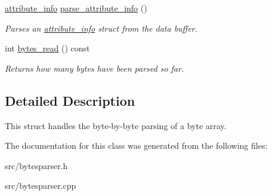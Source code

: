 \begin{DoxyCompactItemize}
\mbox{\label{classBytesParser_ab7c84f75bd3dc2bcac74fd3ff4c6510a}} 
\hyperlink{structattribute__info}{attribute\+\_\+info} \hyperlink{classBytesParser_ab7c84f75bd3dc2bcac74fd3ff4c6510a}{parse\+\_\+attribute\+\_\+info} ()
\begin{DoxyCompactList}\small\item\em Parses an \hyperlink{structattribute__info}{attribute\+\_\+info} struct from the data buffer. \end{DoxyCompactList}\item 
\mbox{\label{classBytesParser_a37f2e2e19b23ba08982241c7ed53b43a}} 
int \hyperlink{classBytesParser_a37f2e2e19b23ba08982241c7ed53b43a}{bytes\+\_\+read} () const
\begin{DoxyCompactList}\small\item\em Returns how many bytes have been parsed so far. \end{DoxyCompactList}\end{DoxyCompactItemize}


\subsection{Detailed Description}
This struct handles the byte-\/by-\/byte parsing of a byte array. 

The documentation for this class was generated from the following files\+:\begin{DoxyCompactItemize}
\item 
src/bytesparser.\+h\item 
src/bytesparser.\+cpp\end{DoxyCompactItemize}

